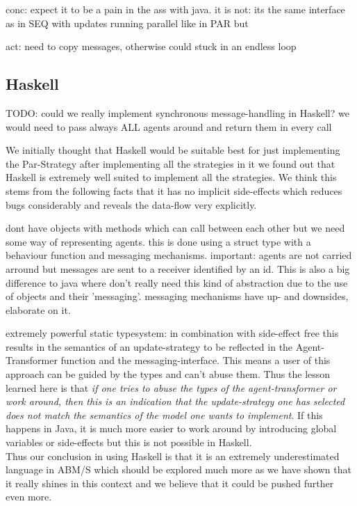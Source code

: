 conc: expect it to be a pain in the ass with java. it is not: its the same interface as in SEQ with updates running parallel like in PAR but 

act: need to copy messages, otherwise could stuck in an endless loop

\subsection{Haskell}
TODO: could we really implement synchronous message-handling in Haskell? we would need to pass always ALL agents around and return them in every call

We initially thought that Haskell would be suitable best for just implementing the Par-Strategy after implementing all the strategies in it we found out that Haskell is extremely well suited to implement all the strategies. We think this stems from the following facts that it has no implicit side-effects which reduces bugs considerably and reveals the data-flow very explicitly.
 
dont have objects with methods which can call between each other but we need some way of representing agents. this is done using a struct type with a behaviour function and messaging mechanisms. important: agents are not carried arround but messages are sent to a receiver identified by an id. This is also a big difference to java where don't really need this kind of abstraction due to the use of objects and their 'messaging'. messaging mechanisms have up- and downsides, elaborate on it.

extremely powerful static typesystem: in combination with side-effect free this results in the semantics of an update-strategy to be reflected in the Agent-Transformer function and the messaging-interface. This means a user of this approach can be guided by the types and can't abuse them. Thus the lesson learned here is that \textit{if one tries to abuse the types of the agent-transformer or work around, then this is an indication that the update-strategy one has selected does not match the semantics of the model one wants to implement}. If this happens in Java, it is much more easier to work around by introducing global variables or side-effects but this is not possible in Haskell. \\
Thus our conclusion in using Haskell is that it is an extremely underestimated language in ABM/S which should be explored much more as we have shown that it really shines in this context and we believe that it could be pushed further even more.

